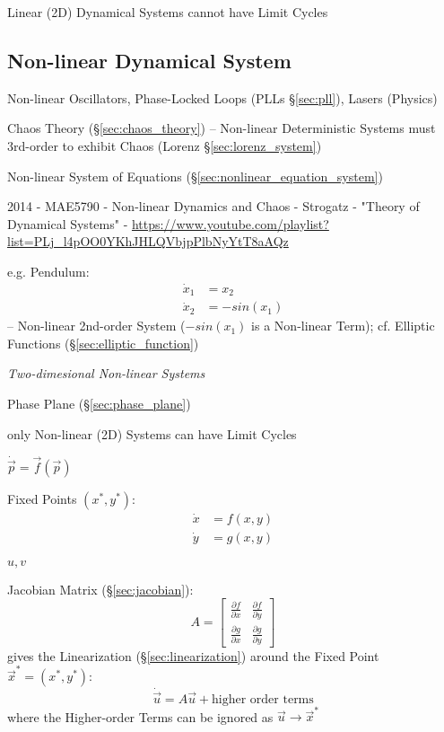 Linear (2D) Dynamical Systems cannot have Limit Cycles



\subsection{Non-linear Dynamical System}\label{sec:nonlinear_dynamical_system}

Non-linear Oscillators, Phase-Locked Loops (PLLs \S\ref{sec:pll}), Lasers
(Physics)

\fist Chaos Theory (\S\ref{sec:chaos_theory}) -- Non-linear Deterministic
Systems must 3rd-order to exhibit Chaos (Lorenz \S\ref{sec:lorenz_system})

\fist Non-linear System of Equations (\S\ref{sec:nonlinear_equation_system})

2014 - MAE5790 - Non-linear Dynamics and Chaos - Strogatz - "Theory of
Dynamical Systems" -
\url{https://www.youtube.com/playlist?list=PLj_l4pOO0YKhJHLQVbjpPlbNyYtT8aAQz}

e.g. Pendulum:
\begin{align*}
  \dot{x}_1 & = x_2 \\
  \dot{x}_2 & = -sin(x_1)
\end{align*}
-- Non-linear 2nd-order System ($-sin(x_1)$ is a Non-linear Term); cf. Elliptic
Functions
(\S\ref{sec:elliptic_function})

\emph{Two-dimesional Non-linear Systems}

\fist Phase Plane (\S\ref{sec:phase_plane})

only Non-linear (2D) Systems can have Limit Cycles

$\dot{\vec{p}} = \vec{f}(\vec{p})$

Fixed Points $(x^*,y^*)$:
\begin{align*}
  \dot{x} & = f(x,y) \\
  \dot{y} & = g(x,y)
\end{align*}

$u, v$

Jacobian Matrix (\S\ref{sec:jacobian}):
\[
  A = \begin{bmatrix}
    \frac{\partial{f}}{\partial{x}} & \frac{\partial{f}}{\partial{y}} \\
    \frac{\partial{g}}{\partial{x}} & \frac{\partial{g}}{\partial{y}}
  \end{bmatrix}
\]
gives the Linearization (\S\ref{sec:linearization}) around the Fixed
Point $\vec{x}^* = (x^*, y^*)$:
\[
  \dot{\vec{u}} = A \vec{u} + \text{higher order terms}
\]
where the Higher-order Terms can be ignored as $\vec{u} \rightarrow \vec{x}^*$

